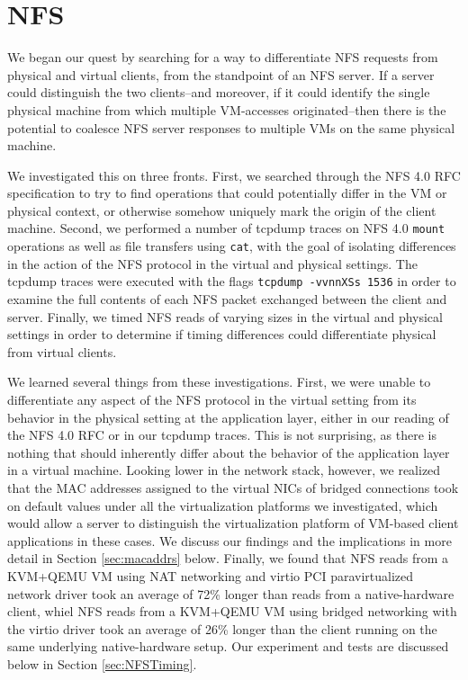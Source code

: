 \documentclass[11pt,pdftex,twocolumn]{article}
\begin{document}
\section{NFS}
We began our quest by searching for a way to differentiate NFS requests from physical and virtual clients, from the standpoint of an NFS server. If a server could distinguish the two clients--and moreover, if it could identify the single physical machine from which multiple VM-accesses originated--then there is the potential to coalesce NFS server responses to multiple VMs on the same physical machine. 

We investigated this on three fronts. First, we searched through the NFS 4.0 RFC specification to try to find operations that could potentially differ in the VM or physical context, or otherwise somehow uniquely mark the origin of the client machine. Second, we performed a number of tcpdump traces on NFS 4.0 \texttt{mount} operations as well as file transfers using \texttt{cat}, with the goal of isolating differences in the action of the NFS protocol in the virtual and physical settings. The tcpdump traces were executed with the flags \texttt{tcpdump -vvnnXSs 1536} in order to examine the full contents of each NFS packet exchanged between the client and server. Finally, we timed NFS reads of varying sizes in the virtual and physical settings in order to determine if timing differences could differentiate physical from virtual clients. 

We learned several things from these investigations. First, we were unable to differentiate any aspect of the NFS protocol in the virtual setting from its behavior in the physical setting at the application layer, either in our reading of the NFS 4.0 RFC or in our tcpdump traces. This is not surprising, as there is nothing that should inherently differ about the behavior of the application layer in a virtual machine. Looking lower in the network stack, however, we realized that the MAC addresses assigned to the virtual NICs of bridged connections took on default values under all the virtualization platforms we investigated, which would allow a server to distinguish the virtualization platform of VM-based client applications in these cases. We discuss our findings and the implications in more detail in Section \ref{sec:macaddrs} below. Finally, we found that NFS reads from a KVM+QEMU VM using NAT networking and virtio PCI paravirtualized network driver took an average of 72\% longer than reads from a native-hardware client, whiel NFS reads from a KVM+QEMU VM using bridged networking with the virtio driver took an average of 26\% longer than the client running on the same underlying native-hardware setup. Our experiment and tests are discussed below in Section \ref{sec:NFSTiming}. 
\end{document}
